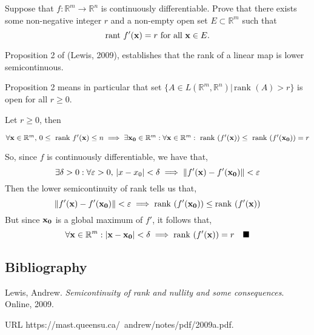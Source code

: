 \documentclass{article}
\newcommand\R{\mathbb{R}}
\begin{document}
Suppose that $f:\R^m\rightarrow\R^n$ is continuously
differentiable. Prove that there exists some non-negative integer $r$
and a non-empty open set $E\subset \R^m$ such that
\[\text{rant }f'(\vb{x})= r\text{ for all }\vb{x}\in E.\]




Proposition 2 of (Lewis, 2009), establishes that the rank of a linear
map is lower semicontinuous.

Proposition 2 means in particular that set $\{A\in L(\R^m,\R^n)|\, \text{rank }(A)>
r\}$ is open for all $r\geq 0$.

Let $r\geq 0$, then

$\forall \vb{x}\in \R^m,\, 0\leq \text{ rank }f'(\vb{x}) \leq n \implies \exists
\vb{x_0}\in \R^m: \forall \vb{x}\in\R^m: \text{ rank }(f'(\vb{x}))\leq \text{ rank
}(f'(\vb{x_0})) = r$

So, since $f$ is continuously differentiable, we have that,
\[\exists \delta>0:\forall \varepsilon >0,\, |x-x_0|<\delta \implies
  \|f'(\vb{x})-f'(\vb{x_0})\| < \varepsilon\]
Then the lower semicontinuity of rank tells us that,
\[\|f'(\vb{x})-f'(\vb{x_0})\| < \varepsilon \implies \text{rank
  }(f'(\vb{x_0}))\leq \text{rank
  }(f'(\vb{x}))\]
But since $\vb{x_0}$ is a global maximum of $f'$, it follows that,
\[\forall\vb{x}\in \R^m:|\vb{x}-\vb{x_0}|<\delta \implies \text{rank
  }(f'(\vb{x})) = r\quad \blacksquare\]

\subsection{Bibliography}
Lewis, Andrew. \textit{Semicontinuity of rank and nullity and some
  consequences}. Online, 2009.

\hspace{7em}URL https://mast.queensu.ca/~andrew/notes/pdf/2009a.pdf.
\end{document}

